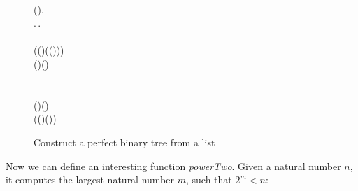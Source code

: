\begin{figure}[ht]
\begin{pboxed}
\\
\>[3]{}\<[5]%
\>[5]{}\mu\;\mathbin{:}(\mathbin{:}\star)\to {}\;\to {}\;.\,{}\<[E]%
\\
\>[5]{}\<[7]%
\>[7]{}\lambda {}\mathbin{:}\star.\,\lambda {}\mathbin{:}\;.\,{}\<[E]%
\\
\>[7]{}\<[9]%
\>[9]{}\;\;\<[E]%
\\
\>[9]{}\<[11]%
\>[11]{}\Rightarrow {}\;\;(\;(\;\;)\;(\;\;(\;))){}\<[E]%
\\
\>[7]{}\<[9]%
\>[9]{}\mid {}\;(\mathbin{:})\;(\mathbin{:}\;)\Rightarrow {}\<[E]%
\\
\>[9]{}\<[11]%
\>[11]{}\;\;\<[E]%
\\
\>[11]{}\<[13]%
\>[13]{}\Rightarrow {}\;\;\<[E]%
\\
\>[9]{}\<[11]%
\>[11]{}\mid {}\;(\mathbin{:})\;(\mathbin{:}\;)\Rightarrow {}\<[E]%
\\
\>[11]{}\<[15]%
\>[15]{}\;\;(\;(\;\;)\;(\;\;)){}\<[E]%
\\
\>[3]{}\<[E]%
\ColumnHook
\end{pboxed}
\)\par\noindent\endgroup\resethooks
  \caption{Construct a perfect binary tree from a list}
  \label{fig:perfectB}
\end{figure}

Now we can define an interesting function \emph{powerTwo}. Given a natural number $n$, it computes the largest natural number $m$, such that $2^{m} < n$:

